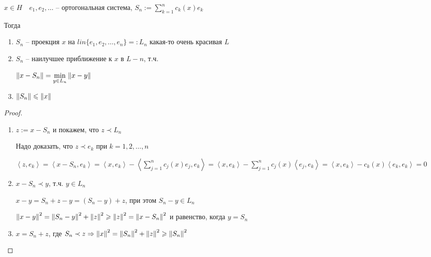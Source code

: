 \begin{theorem}\thmslashn 
	
	$x \in H \quad e_1, e_2, \ldots$ -- ортогональная система,  $S_n:= \sum\limits_{k = 1}^{n} c_k(x)e_k$

	Тогда
	
	\begin{enumerate}
		\item 
		$S_n$ -- проекция $x$ на $lin\{e_1, e_2, \ldots, e_n\} =:L_n$ \TODO какая-то очень красивая $L$
		
		\item
	 	$S_n$ -- наилучшее приближение к $x$ в $L-n$, т.ч. 
	 	
	 	$\left\|x-S_n\right\| = \min\limits_{y \in L_n}\left\|x - y\right\|$
	 	
	 	\item
	 	$\left\|S_n\right\| \leqslant \left\|x\right\|$
		
	\end{enumerate}
\end{theorem}

\begin{proof}\thmslashn

	\begin{enumerate}
		\item 
		$z:= x - S_n$ и покажем, что $z \prec L_n$
		
		Надо доказать, что $z\prec e_k$ при $k = 1, 2, \ldots, n$
		
		$\left\langle z, e_k \right\rangle = \left\langle x - S_n, e_k \right\rangle = \left\langle x, e_k \right\rangle - \left\langle \sum\limits_{j = 1}^{n}c_j(x)e_j, e_k \right\rangle = \left\langle x, e_k \right\rangle - \sum\limits_{j = 1}^{n} c_j(x)\left\langle e_j, e_k \right\rangle = \left\langle x, e_k \right\rangle - c_k(x)\left\langle e_k, e_k \right\rangle = 0$
		
		\item
		$x - S_n \prec y$, т.ч. $y \in L_n$
		
		$x - y = S_n + z - y = (S_n - y) + z$, при этом $S_n - y \in L_n$
		
		$\left\|x - y\right\|^2 = \left\|S_n - y\right\|^2 + \left\|z\right\|^2 \geqslant \left\|z\right\|^2 = \left\|x - S_n\right\|^2$ и равенство, когда $y = S_n$
		
		\item
		$x = S_n + z$, где $S_n \prec z \Rightarrow \left\|x\right\|^2 = \left\|S_n\right\|^2 + \left\|z\right\|^2 \geqslant \left\|S_n\right\|^2$
		
	\end{enumerate}	

\end{proof}

